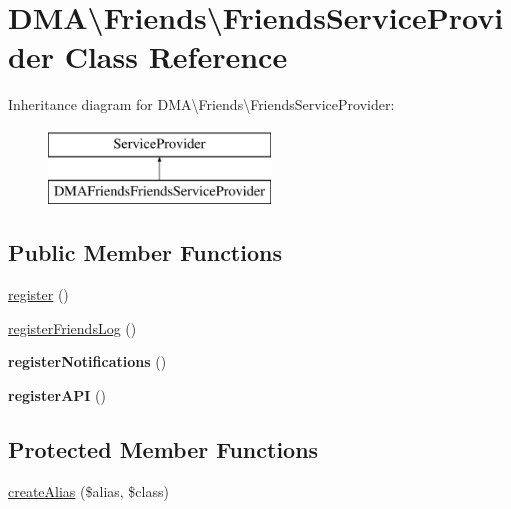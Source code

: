 \hypertarget{classDMA_1_1Friends_1_1FriendsServiceProvider}{}\section{D\+M\+A\textbackslash{}Friends\textbackslash{}Friends\+Service\+Provider Class Reference}
\label{classDMA_1_1Friends_1_1FriendsServiceProvider}
Inheritance diagram for D\+M\+A\textbackslash{}Friends\textbackslash{}Friends\+Service\+Provider\+:\begin{figure}[H]
\begin{center}
\leavevmode
\includegraphics[height=2.000000cm]{df/d6d/classDMA_1_1Friends_1_1FriendsServiceProvider}
\end{center}
\end{figure}
\subsection*{Public Member Functions}
\begin{DoxyCompactItemize}
\item 
\hyperlink{classDMA_1_1Friends_1_1FriendsServiceProvider_a6a90d2cdc4c6b153b45764ba66e154ae}{register} ()
\item 
\hyperlink{classDMA_1_1Friends_1_1FriendsServiceProvider_a2d6ff7101ca6389c00e298f2d594a1df}{register\+Friends\+Log} ()
\item 
\hypertarget{classDMA_1_1Friends_1_1FriendsServiceProvider_a4a51f5a9c32c49373284c0b35f8dfd35}{}{\bfseries register\+Notifications} ()\label{classDMA_1_1Friends_1_1FriendsServiceProvider_a4a51f5a9c32c49373284c0b35f8dfd35}

\item 
\hypertarget{classDMA_1_1Friends_1_1FriendsServiceProvider_a36966f2e276697e1143a2d670680122b}{}{\bfseries register\+A\+P\+I} ()\label{classDMA_1_1Friends_1_1FriendsServiceProvider_a36966f2e276697e1143a2d670680122b}

\end{DoxyCompactItemize}
\subsection*{Protected Member Functions}
\begin{DoxyCompactItemize}
\item 
\hyperlink{classDMA_1_1Friends_1_1FriendsServiceProvider_acad52dc5020c640afed3c4fe82243051}{create\+Alias} (\$alias, \$class)
\end{DoxyCompactItemize}


